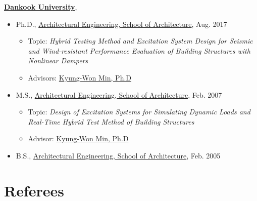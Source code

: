 \nocite{*}
\href{http://www.dankook.ac.kr/}{\textbf{Dankook University}},
\begin{itemize}[label=]
	\item Ph.D., \href{http://cms.dankook.ac.kr/web/archi} {Architectural Engineering, School of Architecture}, Aug. 2017
	      \begin{itemize}
		      \item Topic: \emph{Hybrid Testing Method and Excitation System Design for Seismic and Wind-resistant Performance Evaluation of Building Structures with Nonlinear Dampers}
		      \item Advisors: \href{http://cms.dankook.ac.kr/web/archi/-16?p_p_id=DeptInfo_WAR_empInfoportlet&p_p_lifecycle=0&p_p_state=normal&p_p_mode=view&p_p_col_id=column-2&p_p_col_count=1&_DeptInfo_WAR_empInfoportlet_empId=2zEyEnhbhLlys2HRljBFWg%3D%3D&_DeptInfo_WAR_empInfoportlet_action=view_message}{Kyung-Won Min, Ph.D}
	      \end{itemize}

	\item M.S., \href{http://cms.dankook.ac.kr/web/archi} {Architectural Engineering, School of Architecture}, Feb. 2007
	      \begin{itemize}
		      \item Topic: \emph{Design of Excitation Systems for Simulating Dynamic Loads and Real-Time Hybrid Test Method of Building Structures}
		      \item Advisor: \href{http://cms.dankook.ac.kr/web/archi/-16?p_p_id=DeptInfo_WAR_empInfoportlet&p_p_lifecycle=0&p_p_state=normal&p_p_mode=view&p_p_col_id=column-2&p_p_col_count=1&_DeptInfo_WAR_empInfoportlet_empId=2zEyEnhbhLlys2HRljBFWg%3D%3D&_DeptInfo_WAR_empInfoportlet_action=view_message}{Kyung-Won Min, Ph.D}
	      \end{itemize}
	\item B.S., \href{http://cms.dankook.ac.kr/web/archi}{Architectural Engineering, School of Architecture}, Feb. 2005
\end{itemize}
\section*{Referees}
\newcolumntype{b}{X}

